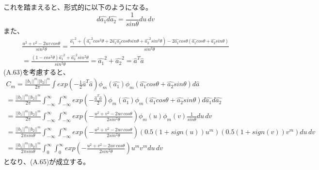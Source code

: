 \documentclass{jsarticle}
\begin{document}
これを踏まえると、形式的に以下のようになる。
\begin{equation}
d\hat{a_1}d\hat{a_2} = \frac{1}{sin\theta}du\,dv
\end{equation}
また、
\begin{equation}
\begin{split}
\frac{u^2 + v^2 - 2uv\,cos\theta}{sin^2\theta} 
= \frac{\hat{a_1}^2 + (\hat{a_1}^2 cos^2\theta + 2\hat{a_1}\hat{a_2}cos\theta sin\theta + \hat{a_2}^2 sin^2\theta) - 2\hat{a_1}cos\theta(\hat{a_1}cos\theta + \hat{a_2}sin\theta)}{sin^2\theta}\\
= \frac{(1 - cos^2 \theta)\hat{a_1}^2 + \hat{a_2}^2 sin^2\theta}{sin^2\theta}
= \hat{a_1}^2 + \hat{a_2}^2 = \hat{a}^T \hat{a}
\end{split}
\end{equation}
(A.63)を考慮すると、
\begin{equation}
\begin{split}
C_m = \frac{||b_1||^m ||b_2||^m }{2\pi} \int exp(-\frac{1}{2}\hat{a}^T \hat{a}) \phi_m (\hat{a_1}) \phi_m(\hat{a_1} cos\theta + \hat{a_2}sin\theta) d\hat{a}\\
= \frac{||b_1||^m ||b_2||^m }{2\pi} \int_{-\infty}^{\infty} \int_{-\infty}^{\infty} exp(-\frac{\hat{a}^T\hat{a}}{2}) \phi_m (\hat{a_1}) \phi_m(\hat{a_1} cos\theta + \hat{a_2}sin\theta) d\hat{a_1}d\hat{a_2}\\
= \frac{||b_1||^m ||b_2||^m }{2\pi} \int_{-\infty}^{\infty} \int_{-\infty}^{\infty} exp(-\frac{u^2 + v^2 - 2uv\,cos\theta}{2sin^2\theta}) \phi_m (u) \phi_m(v) \frac{1}{sin\theta}du\,dv\\
= \frac{||b_1||^m ||b_2||^m }{2\pi{sin\theta}} \int_{-\infty}^{\infty} \int_{-\infty}^{\infty} exp(-\frac{u^2 + v^2 - 2uv\,cos\theta}{2sin^2\theta}) 
(0.5(1+ sign(u))u^m) (0.5(1+ sign(v))v^m) du\,dv\\
= \frac{||b_1||^m ||b_2||^m }{2\pi{sin\theta}} \int_{0}^{\infty} \int_{0}^{\infty} exp(-\frac{u^2 + v^2 - 2uv\,cos\theta}{2sin^2\theta}) 
u^m v^m du\,dv
\end{split}
\end{equation}
となり、(A.65)が成立する。
\end{document}
